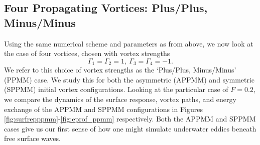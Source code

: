 \documentclass[a4paper,11pt]{article}
\begin{document}
\subsection{Four Propagating Vortices: Plus/Plus, Minus/Minus}
Using the same numerical scheme and parameters as from above, we now look at the case of four vortices, chosen with vortex strengths
\[
\Gamma_{1}=\Gamma_{2}=1, ~ \Gamma_{3}=\Gamma_{4}=-1.
\]
We refer to this choice of vortex strengths as the `Plus/Plus, Minus/Minus' (PPMM) case.  We study this for both the asymmetric (APPMM) and symmetric (SPPMM) initial vortex configurations.  Looking at the particular case of $F=0.2$, we compare the dynamics of the surface response, vortex paths, and energy exchange of the APPMM and SPPMM configurations in Figures \ref{fig:surfrepppmm}-\ref{fig:eprof_ppmm} respectively. Both the APPMM and SPPMM cases give us our first sense of how one might simulate underwater eddies beneath free surface waves.  
\end{document}
